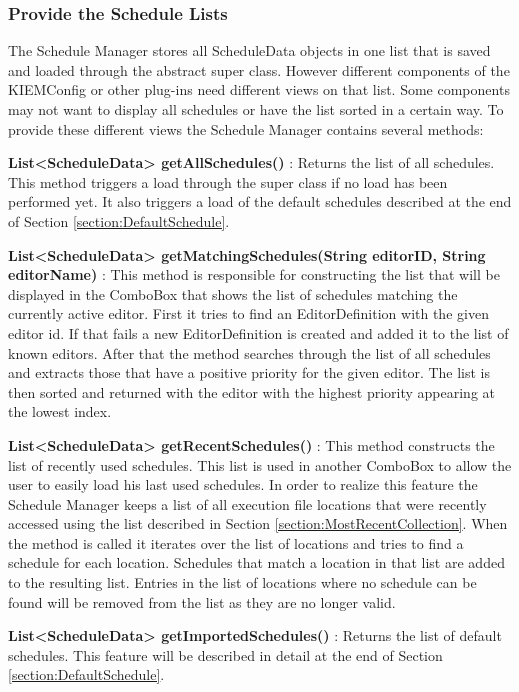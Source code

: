 \subsubsection{Provide the Schedule Lists}
\label{section:ProvideScheduleLists}
The Schedule Manager stores all ScheduleData objects in one list that is saved and loaded through
the abstract super class. However different components of the \ac{KIEMConfig} or other plug-ins 
need different views on that list. Some components may not want to display all schedules or have
the list sorted in a certain way. To provide these different views the Schedule Manager contains
several methods:
\begin{description}
 \item \textbf{List<ScheduleData> getAllSchedules()} : Returns the list of all schedules. This
method triggers a load through the super class if no load has been performed yet. It also triggers
a load of the default schedules described at the end of Section \ref{section:DefaultSchedule}.
 \item \textbf{List<ScheduleData> getMatchingSchedules(String editorID, String editorName)} :
This method is responsible for constructing the list that will be displayed in the ComboBox that
shows the list of schedules matching the currently active editor. First it tries to find an
EditorDefinition with the given editor id. If that fails a new EditorDefinition is created and
added it to the list of known editors. After that the method searches through the list of
all schedules and extracts those that have a positive priority for the given editor. The list
is then sorted  and returned with the editor with the highest priority appearing at the lowest index.
 \item \textbf{List<ScheduleData> getRecentSchedules()} : This method constructs the list of 
recently used schedules. This list is used in another ComboBox to allow the user to easily load
his last used schedules. In order to realize this feature the Schedule Manager keeps a list of
all execution file locations that were recently accessed using the list described in Section
\ref{section:MostRecentCollection}. When the method is called it iterates over the list of locations
and tries to find a schedule for each location. Schedules that match a location in that list are 
added to the resulting list. Entries in the list of locations where no schedule can be found will
be removed from the list as they are no longer valid.
 \item \textbf{List<ScheduleData> getImportedSchedules()} : Returns the list of default schedules.
This feature will be described in detail at the end of Section \ref{section:DefaultSchedule}.
\end{description}


